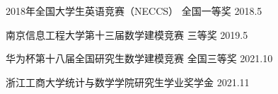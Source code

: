 



\begin{cvhonors}

  \cvhonor
    {2018年全国大学生英语竞赛（NECCS）} %
    {} %
    {全国一等奖} %
    {2018.5} %

  \cvhonor
    {南京信息工程大学第十三届数学建模竞赛} %
    {} %
    {三等奖} %
    {2019.5} %

\cvhonor
  {华为杯第十八届全国研究生数学建模竞赛} %
  {} %
  {全国三等奖} %
  {2021.10} %

\cvhonor
  {浙江工商大学统计与数学学院研究生学业奖学金} %
  {} %
  {} %
  {2021.11} %




\end{cvhonors}




